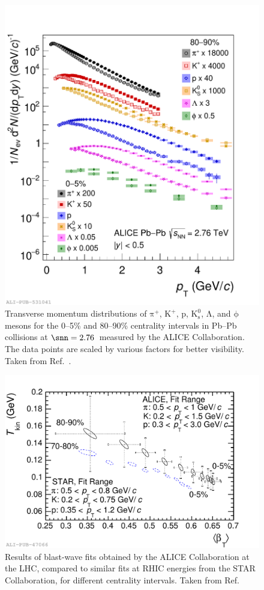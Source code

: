 \begin{figure}[t]
  \centering
  \includegraphics[width=0.7\linewidth]{Figures/Chapter 1/spectra_run1.pdf}
  \caption{Transverse momentum distributions of $\mathrm{\pi^+}$, $\mathrm{K^+}$, p, $\mathrm{K^0_s}$, $\mathrm{\Lambda}$, and $\mathrm{\phi}$ mesons for the 0--5\% and 80--90\% centrality intervals in Pb--Pb collisions at $\snn=2.76$~\tev measured by the ALICE Collaboration. The data points are scaled by various factors for better visibility. Taken from Ref.~\cite{ALICE:2022wpn}.}
  \label{fig:RadialFlow}
\end{figure}

\begin{figure}[htb]
  \centering
  \includegraphics[width=0.7\linewidth]{Figures/Chapter 1/2014-Feb-27-cBlastWaveVsSTAR.pdf}
  \caption{Results of blast-wave fits obtained by the ALICE Collaboration at the LHC, compared to similar fits at RHIC energies from the STAR Collaboration, for different centrality intervals. Taken from Ref.~\cite{ALICE:2013mez}}
  \label{fig:blast_wave_fit}
\end{figure}

